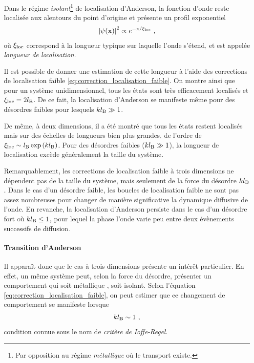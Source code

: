 Dans le régime \emph{isolant}\footnote{Par opposition au régime \emph{métallique} où le transport existe.} de localisation d'Anderson, la fonction d'onde reste localisée aux alentours du point d'origine et présente un profil exponentiel
\begin{equation}
\left| \psi (\mathbf{x}) \right|^2 \propto e^{-\mathrm{x}/\xi_{\mathrm{loc}}} \text{ ,}
\label{eq:exponentielle_anderson}
\end{equation}
où $\xi_{\mathrm{loc}}$ correspond à la longueur typique sur laquelle l'onde s'étend, et est appelée \emph{longueur de localisation}.

Il est possible de donner une estimation de cette longueur à l'aide des corrections de localisation faible \ref{eq:correction_localisation_faible}. On montre ainsi que pour un système unidimensionnel, tous les états sont très efficacement localisés et $\xi_{\mathrm{loc}}=2 l_{\mathrm{B}}$. De ce fait, la localisation d'Anderson se manifeste même pour des désordres faibles pour lesquels $kl_{\mathrm{B}} \gg 1$. 

De même, à deux dimensions, il a été montré que tous les états restent localisés mais sur des échelles de longueurs bien plus grandes, de l'ordre de $\xi_{\mathrm{loc}} \sim l_{\mathrm{B}} \exp{(k l_{\mathrm{B}})}$. Pour des désordres faibles ($k l_{\mathrm{B}} \gg 1$), la longueur de localisation excède généralement la taille du système. 

Remarquablement, les corrections de localisation faible à trois dimensions ne dépendent pas de la taille du système, mais seulement de la force du désordre $k l_{\mathrm{B}}$. Dans le cas d'un désordre faible, les boucles de localisation faible ne sont pas assez nombreuses pour changer de manière significative la dynamique diffusive de l'onde. En revanche, la localisation d'Anderson persiste dans le cas d'un désordre fort où $k l_{\mathrm{B}} \leq 1$, pour lequel la phase l'onde varie peu entre deux évènements successifs de diffusion. 



\paragraph*{Transition d'Anderson}
Il apparaît donc que le cas à trois dimensions présente un intérêt particulier. En effet, un même système peut, selon la force du désordre, présenter un comportement qui soit métallique , soit isolant. Selon l'équation \ref{eq:correction_localisation_faible}, on peut estimer que ce changement de comportement se manifeste lorsque
\begin{equation}
k l_{\mathrm{B}} \sim 1 \text{ ,}
\label{eq:ioffe_regel}
\end{equation}
condition connue sous le nom de \emph{critère de Ioffe-Regel}. 

